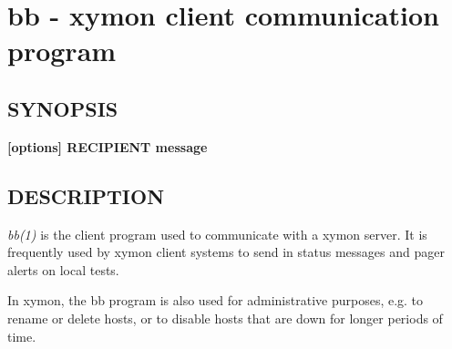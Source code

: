 %
\newpage
\section{bb - xymon client communication program}

\subsection{SYNOPSIS}
\textbf{ [options] RECIPIENT message}

\subsection{DESCRIPTION}
\emph{bb(1)} is the client program used to communicate with a xymon
server. It is frequently used by xymon client systems to send in
status messages and pager alerts on local tests. 


In xymon, the bb program is also used for administrative purposes,
e.g. to rename or delete hosts, or to disable hosts that are down for
longer periods of time. 

 
